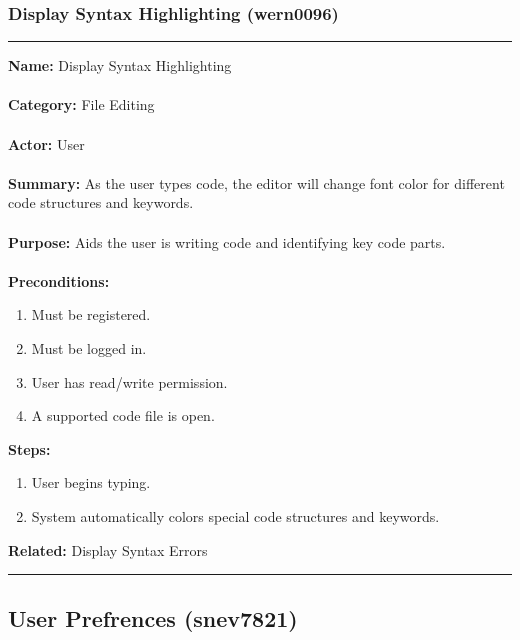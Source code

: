 \documentclass[11pt]{report}
\begin{document}
\subsubsection{Display Syntax Highlighting (wern0096)}
\vspace{2pt}
\hrule
\vspace{8pt}
	\noindent\textbf{Name:} Display Syntax Highlighting \\ \\
	\textbf{Category:} File Editing \\ \\
	\textbf{Actor:} User \\ \\
	\textbf{Summary:} As the user types code, the editor will change font color for different code structures and keywords. \\ \\
	\textbf{Purpose:} Aids the user is writing code and identifying key code parts. \\ \\
	\textbf{Preconditions:} 
	\begin{enumerate}
		\item Must be registered.
		\item Must be logged in.
		\item User has read/write permission.
		\item A supported code file is open.
	\end{enumerate}
	\textbf{Steps:}
	\begin{enumerate}
		\item User begins typing.
		\item System automatically colors special code structures and keywords.
	\end{enumerate}
	\textbf{Related:} Display Syntax Errors
\vspace{8pt}
\hrule
\newpage

\subsection{User Prefrences (snev7821)}
\end{document}
